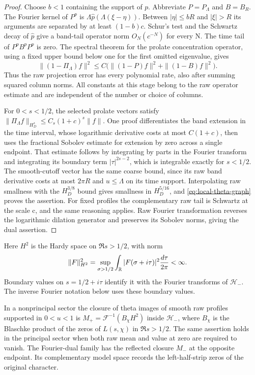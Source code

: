 \begin{proof}
Choose $b<1$ containing the support of $p$.
Abbreviate $P=P_\Lambda$ and $B=B_R$.
The Fourier kernel of $P^p$ is
$\Lambda\widehat p(\Lambda(\xi-\eta))$.
Between $|\eta|\leq bR$ and $|\xi|>R$ its arguments are separated
by at least $(1-b)c$.  Schur's test and the Schwartz decay of
$\widehat p$ give a band-tail operator norm $O_N(c^{-N})$ for every N.
The time tail of $P^pB^pP^p$ is zero.
The spectral theorem for the prolate concentration operator, using a
fixed upper bound below one for the first omitted eigenvalue, gives
\[
 \|(1-\Pi_\Lambda)f\|^2
   \leq C\bigl(\|(1-P)f\|^2+\|(1-B)f\|^2\bigr).
\]
Thus the raw projection error has every polynomial rate, also after
summing squared column norms. All constants at this stage belong
to the raw operator estimate and are independent of the number
or choice of columns.

For $0<s<1/2$, the selected prolate vectors satisfy
$\|\Pi_\Lambda f\|_{H_D^s}\leq C_s(1+c)^s\|f\|$.
One proof differentiates the band extension in the time interval,
whose logarithmic derivative costs at most $C(1+c)$, then uses the
fractional Sobolev estimate for extension by zero across a single
endpoint.  That estimate follows by integrating by parts in the
Fourier transform and integrating its boundary term
$|\tau|^{2s-2}$, which is integrable exactly for $s<1/2$.
The smooth-cutoff vector has the same coarse bound, since its raw
band derivative costs at most $2\pi R$ and $u\leq\Lambda$ on its
time support.  Interpolating raw smallness with the $H_D^{3/8}$
bound gives smallness in $H_D^{5/16}$, and
\eqref{eq:local-theta-graph} proves the assertion.
For fixed profiles the complementary raw tail is Schwartz at the
scale c, and the same reasoning applies.  Raw Fourier transformation
reverses the logarithmic dilation generator and preserves its
Sobolev norms, giving the dual assertion.
\end{proof}

Here $H^2$ is the Hardy space on $\Re s>1/2$, with norm
\[
 \|F\|_{H^2}^2=\sup_{\sigma>1/2}
       \int_\mathbb R|F(\sigma+i\tau)|^2\frac{d\tau}{2\pi}<\infty.
\]
Boundary values on $s=1/2+i\tau$ identify it with the Fourier
transforms of $\mathcal H_-$. The inverse Fourier notation below
uses these boundary values.

\begin{lemma}\label{lem:local-halfline-closure}
In a nonprincipal sector the closure of theta images of smooth raw
profiles supported in $0<u<1$ is
$M_+=\mathcal F^{-1}(B_\chi H^2)$ inside $\mathcal H_-$, where
$B_\chi$ is the Blaschke product of the zeros of $L(s,\chi)$ in
$\Re s>1/2$.  The same assertion holds in the principal sector
when both raw mean and value at zero are required to vanish.
The Fourier-dual family has the reflected closure $M_-$ at the
opposite endpoint. Its complementary model space records the
left-half-strip zeros of the original character.
\end{lemma}

